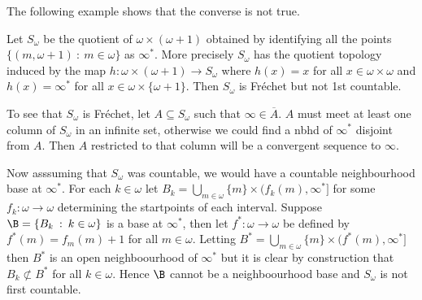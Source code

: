 \documentclass{article}
\begin{document}
The following example shows that the converse is not true. 
\begin{exam}
    Let \(S_{\omega}\) be the quotient of \(\omega \times (\omega + 1)\) obtained by identifying all the points \(\{(m, \omega + 1) \: : \: m \in \omega\}\) as \(\infty^{\ast}\). More precisely \(S_{\omega}\) has the quotient topology induced by the map \(h: \omega \times (\omega + 1) \to S_{\omega}\) where \(h(x) = x\) for all \(x \in \omega \times \omega\) and \(h(x) = \infty^{\ast}\) for all \(x \in \omega \times \{\omega + 1\}\). Then \(S_{\omega}\) is Fréchet but not 1st countable. 
    
    To see that \(S_{\omega}\) is Fréchet, let \(A \subseteq S_{\omega}\) such that \(\infty \in \overline{A}\). \(A\) must meet at least one column of \(S_{\omega}\) in an infinite set, otherwise we could find a nbhd of \(\infty^{\ast}\) disjoint from \(A\). Then \(A\) restricted to that column will be a convergent sequence to \(\infty\).
    
    Now asssuming that \(S_{\omega}\) was countable, we would have a countable neighbourhood base at \(\infty^{\ast}\). For each \(k \in \omega\) let \(B_k = \bigcup_{m \in \omega}\{m\} \times (f_k(m), \infty^{\ast}]\) for some \(f_k: \omega \to \omega\) determining the startpoints of each interval. Suppose \(\B = \{B_k \: : \: k \in \omega\}\) is a base at \(\infty^{\ast}\), then let \(f^{\ast}: \omega \to \omega\) be defined by \(f^{\ast}(m) = f_m(m) + 1\) for all \(m \in \omega\). Letting \(B^{\ast} = \bigcup_{m \in \omega}\{m\} \times (f^{\ast}(m), \infty^{\ast}]\) then \(B^{\ast}\) is an open neighboourhood of \(\infty^{\ast}\) but it is clear by construction that \(B_k \not\subset B^{\ast}\) for all \(k \in \omega\). Hence \(\B\) cannot be a neighboourhood base and   \(S_{\omega}\) is not first countable.
\end{exam}
\end{document}
